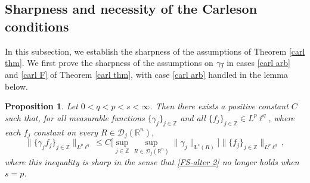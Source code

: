 \documentclass[11pt, reqno]{amsart}
\newtheorem{proposition}[theorem]{Proposition}
\theoremstyle{definition}
\theoremstyle{remark}
\numberwithin{equation}{section}
\newcommand{\D}{\mathscr D}
\newcommand{\Z}{\mathbb Z}
\newcommand{\vj}{\vec{\textit{\j}}}
\newcommand{\aveL}{\textit{\L}}
\newcommand{\Norm}[2]{\|#1\|_{#2}}
\newcommand{\bNorm}[2]{\big\|#1\big\|_{#2}}
\begin{document}
\subsection{Sharpness and necessity of the Carleson conditions} \label{Carl sharp}

In this subsection, we establish the sharpness of the assumptions of Theorem \ref{carl thm}.
We first prove the sharpness of the assumptions on $\gamma_{\vj}$ in cases
\eqref{carl arb} and \eqref{carl F} of Theorem \ref{carl thm},
with case \eqref{carl arb} handled in the lemma below.

\begin{proposition}\label{carl small q2}
Let $0<q<p<s<\infty$.
Then there exists a positive constant $C$ such that,
for all measurable functions $\{\gamma_j\}_{j\in\mathbb Z}$ and
all $\{f_j\}_{j\in\mathbb Z}\in L^p\ell^q$,
where each $f_{j}$ constant on every $R\in\D_{j}(\mathbb R^n)$,
\begin{equation}\label{FS-alter 2}
\bNorm{\{\gamma_jf_j\}_{j\in\mathbb Z}}{L^p\ell^q}
\le C\bigg[\sup_{j\in\Z}\sup_{R\in\D_j(\mathbb R^n)}
\Norm{\gamma_j}{\aveL^s(R)}\bigg]
\bNorm{\{ f_j\}_{j\in\mathbb Z}}{L^p\ell^q},
\end{equation}
where this inequality is sharp in the sense that
\eqref{FS-alter 2} no longer holds when $s = p$.
\end{proposition}
\end{document}
